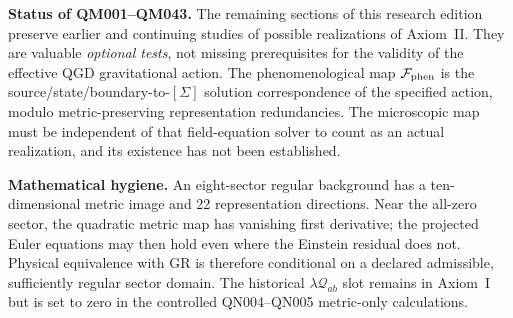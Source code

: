 \documentclass[11pt,a4paper]{article}
\begin{document}
\noindent\textbf{Status of QM001--QM043.} The remaining sections of this research edition preserve earlier and continuing studies of possible realizations of Axiom~II. They are valuable \emph{optional tests}, not missing prerequisites for the validity of the effective QGD gravitational action. The phenomenological map $\mathcal F_{\rm phen}$ is the source/state/boundary-to-$[\Sigma]$ solution correspondence of the specified action, modulo metric-preserving representation redundancies. The microscopic map must be independent of that field-equation solver to count as an actual realization, and its existence has not been established.

\noindent\textbf{Mathematical hygiene.} An eight-sector regular background has a ten-dimensional metric image and 22 representation directions. Near the all-zero sector, the quadratic metric map has vanishing first derivative; the projected Euler equations may then hold even where the Einstein residual does not. Physical equivalence with GR is therefore conditional on a declared admissible, sufficiently regular sector domain. The historical $\lambda\mathcal Q_{ab}$ slot remains in Axiom~I but is set to zero in the controlled QN004--QN005 metric-only calculations.
\end{document}
